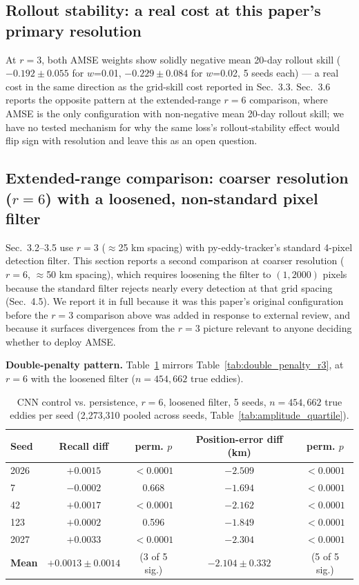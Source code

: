 \documentclass[11pt]{article}
\begin{document}
\subsection{Rollout stability: a real cost at this paper's primary resolution}

At $r=3$, both AMSE weights show solidly negative mean 20-day rollout skill ($-0.192\pm0.055$ for $w$=0.01, $-0.229\pm0.084$ for $w$=0.02, 5 seeds each) --- a real cost in the same direction as the grid-skill cost reported in Sec.~3.3. Sec.~3.6 reports the opposite pattern at the extended-range $r=6$ comparison, where AMSE is the only configuration with non-negative mean 20-day rollout skill; we have no tested mechanism for why the same loss's rollout-stability effect would flip sign with resolution and leave this as an open question.

\subsection{Extended-range comparison: coarser resolution ($r=6$) with a loosened, non-standard pixel filter}

Sec.~3.2--3.5 use $r=3$ ($\approx$25 km spacing) with py-eddy-tracker's standard 4-pixel detection filter. This section reports a second comparison at coarser resolution ($r=6$, $\approx$50 km spacing), which requires loosening the filter to $(1, 2000)$ pixels because the standard filter rejects nearly every detection at that grid spacing (Sec.~4.5). We report it in full because it was this paper's original configuration before the $r=3$ comparison above was added in response to external review, and because it surfaces divergences from the $r=3$ picture relevant to anyone deciding whether to deploy AMSE.

\textbf{Double-penalty pattern.} Table~\ref{tab:double_penalty} mirrors Table~\ref{tab:double_penalty_r3}, at $r=6$ with the loosened filter ($n=454{,}662$ true eddies).

\begin{table}[h]
\centering
\caption{CNN control vs. persistence, $r=6$, loosened filter, 5 seeds, $n=454{,}662$ true eddies per seed (2,273,310 pooled across seeds, Table~\ref{tab:amplitude_quartile}).}
\label{tab:double_penalty}
\begin{tabular}{lcccc}
\toprule
Seed & Recall diff & perm. $p$ & Position-error diff (km) & perm. $p$ \\
\midrule
2026 & $+0.0015$ & $<0.0001$ & $-2.509$ & $<0.0001$ \\
7 & $-0.0002$ & 0.668 & $-1.694$ & $<0.0001$ \\
42 & $+0.0017$ & $<0.0001$ & $-2.162$ & $<0.0001$ \\
123 & $+0.0002$ & 0.596 & $-1.849$ & $<0.0001$ \\
2027 & $+0.0033$ & $<0.0001$ & $-2.304$ & $<0.0001$ \\
\midrule
\textbf{Mean} & $\mathbf{+0.0013 \pm 0.0014}$ & (3 of 5 sig.) & $\mathbf{-2.104 \pm 0.332}$ & (5 of 5 sig.) \\
\bottomrule
\end{tabular}
\end{table}
\end{document}
